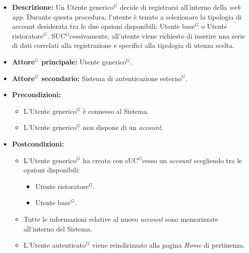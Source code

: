 \label{usecase:Effettua registrazione}

\begin{itemize}
	\item \textbf{Descrizione:} Un \gls{Utente generico}$^G$ decide di registrarsi all'interno della \textit{web app}. 
    Durante questa procedura, l'utente è tenuto a selezionare la tipologia di account desiderata tra le due opzioni disponibili: \gls{Utente base}$^G$ o \gls{Utente ristoratore}$^G$. 
    S\gls{UC}$^G$cessivamente, all'utente viene richiesto di inserire una serie di dati correlati alla registrazione e specifici alla tipologia di utenza scelta.

	\item \textbf{\gls{Attore}$^G$ principale:} \gls{Utente generico}$^G$.
	\item \textbf{\gls{Attore}$^G$ secondario:} Sistema di autenticazione esterno$^G$.
	\item \textbf{Precondizioni:}
        \begin{itemize}
            \item L'\gls{Utente generico}$^G$ è connesso al Sistema.
            \item L'\gls{Utente generico}$^G$ non dispone di un \textit{account}.
        \end{itemize}
	\item \textbf{Postcondizioni:}
        \begin{itemize} 
            \item L'\gls{Utente generico}$^G$ ha creato con s\gls{UC}$^G$cesso un \textit{account} scegliendo tra le opzioni disponibili:
            \begin{itemize}
                \item \gls{Utente ristoratore}$^G$.
                \item \gls{Utente base}$^G$.
            \end{itemize}
            \item Tutte le informazioni relative al nuovo \textit{account} sono memorizzate all'interno del Sistema.
            \item L'\gls{Utente autenticato}$^G$ viene reindirizzato alla pagina \textit{Home} di pertinenza.
        \end{itemize}



\end{itemize}
